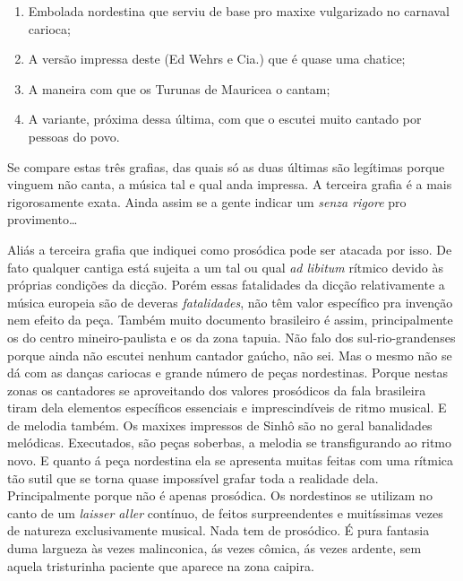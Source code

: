 \begin{enumerate}
\item  Embolada nordestina que serviu de base pro maxixe vulgarizado no carnaval carioca; 
\item  A versão impressa deste (Ed Wehrs e Cia.) que é quase uma chatice; 
\item  A maneira com que os Turunas de Mauricea o cantam;
\item  A variante, próxima dessa última, com que o escutei muito cantado por pessoas do povo. 
\end{enumerate}

Se compare estas três grafias, das quais só as duas
últimas são legítimas porque vinguem não canta, a música tal e qual anda
impressa. A terceira grafia é a mais rigorosamente exata. Ainda assim se
a gente indicar um \textit{senza rigore} pro provimento\ldots{}



Aliás a terceira grafia que indiquei como prosódica pode ser atacada por
isso. De fato qualquer cantiga está sujeita a um tal ou qual \textit{ad
libitum} rítmico devido às próprias condições da dicção. Porém essas
fatalidades da dicção relativamente a música europeia são de deveras
\textit{fatalidades}, não têm valor específico pra invenção nem efeito da
peça. Também muito documento brasileiro é assim, principalmente os do
centro mineiro-paulista e os da zona tapuia. Não falo dos
sul-rio-grandenses porque ainda não escutei nenhum cantador gaúcho, não
sei. Mas o mesmo não se dá com as danças cariocas e grande número de
peças nordestinas. Porque nestas zonas os cantadores se aproveitando dos
valores prosódicos da fala brasileira tiram dela elementos específicos
essenciais e imprescindíveis de ritmo musical. E de melodia também. Os
maxixes impressos de Sinhô são no geral banalidades melódicas.
Executados, são peças soberbas, a melodia se transfigurando ao ritmo
novo. E quanto á peça nordestina ela se apresenta muitas feitas com uma
rítmica tão sutil que se torna quase impossível grafar toda a realidade
dela. Principalmente porque não é apenas prosódica. Os nordestinos se
utilizam no canto de um \textit{laisser aller} contínuo, de feitos
surpreendentes e muitíssimas vezes de natureza exclusivamente musical.
Nada tem de prosódico. É pura fantasia duma largueza às vezes
malinconica, ás vezes cômica, ás vezes ardente, sem aquela tristurinha
paciente que aparece na zona caipira.


